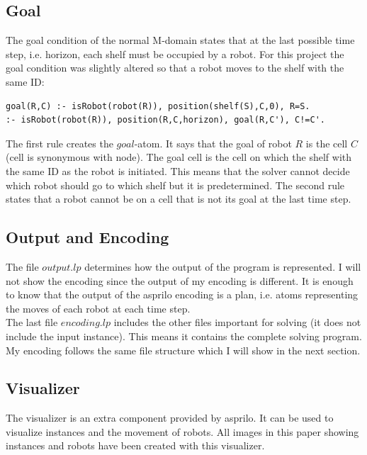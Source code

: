 \documentclass[runningheads]{llncs}
\begin{document}
\subsection{Goal}
The goal condition of the normal M-domain states that at the last possible time step, i.e. horizon, each shelf must be occupied by a robot. For this project the goal condition was slightly altered so that a robot moves to the shelf with the same ID:
\begin{verbatim}
goal(R,C) :- isRobot(robot(R)), position(shelf(S),C,0), R=S.
:- isRobot(robot(R)), position(R,C,horizon), goal(R,C'), C!=C'.
\end{verbatim}
The first rule creates the $goal$-atom. It says that the goal of robot $R$ is the cell $C$ (cell is synonymous with node). The goal cell is the cell on which the shelf with the same ID as the robot is initiated. This means that the solver cannot decide which robot should go to which shelf but it is predetermined. The second rule states that a robot cannot be on a cell that is not its goal at the last time step.
\subsection{Output and Encoding}
The file $output.lp$ determines how the output of the program is represented. I will not show the encoding since the output of my encoding is different. It is enough to know that the output of the asprilo encoding is a plan, i.e. atoms representing the moves of each robot at each time step. \\
The last file $encoding.lp$ includes the other files important for solving (it does not include the input instance). This means it contains the complete solving program. My encoding follows the same file structure which I will show in the next section.
\subsection{Visualizer}
The visualizer is an extra component provided by asprilo. It can be used to visualize instances and the movement of robots. All images in this paper showing instances and robots have been created with this visualizer.
\end{document}
